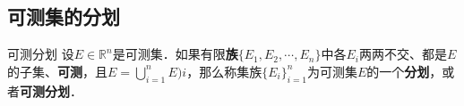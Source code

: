 

\subsection{可测集的分划}

\begin{definition}{可测分划}
设$E\in\mathbb{R}^n$是可测集．如果有限\textbf{族}$\{E_1, E_2, \cdots, E_n\}$中各$E_i$两两不交、都是$E$的子集、\textbf{可测}，且$E=\bigcup^n_{i=1}E)i$，那么称集族$\{E_i\}_{i=1}^n$为可测集$E$的一个\textbf{分划}，或者\textbf{可测分划}．
\end{definition}





















